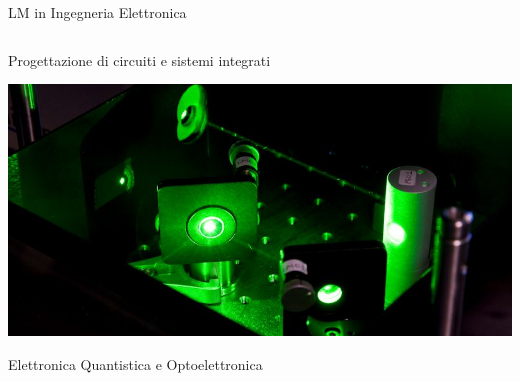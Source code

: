\documentclass{beamer}
\begin{document}
\begin{frame}{LM in Ingegneria Elettronica}
\begin{columns}
\begin{column}{0.4\textwidth}
				Progettazione di circuiti e sistemi integrati

				\vspace{0.3cm}
				\includegraphics[width=\textwidth]{quantum_electronics.jpeg}

				Elettronica Quantistica e Optoelettronica
			\end{column}
		\end{columns}
	\end{frame}
\end{document}
